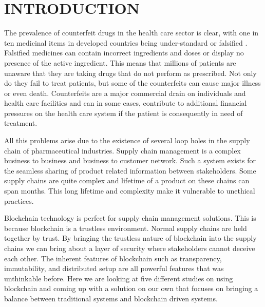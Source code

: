 \documentclass[12pt,a4paper]{report}
\begin{document}
\newpage


\renewcommand{\chaptername}{CHAPTER}
\chapter{INTRODUCTION}
\thispagestyle{fancy}
\pagestyle{fancy}
\renewcommand*{\thepage}{\footnotesize\arabic{page}} %
\onehalfspacing

\setlength{\parindent}{5ex}
\hspace*{1cm}The prevalence of counterfeit drugs in the health care sector is clear, with one in ten medicinal items in developed countries being under-standard or falsified \cite{IEEEexample:article_typical}. Falsified medicines can contain incorrect ingredients and doses or display no presence of the active ingredient. This means that millions of patients are unaware that they are taking drugs that do not perform as prescribed. Not only do they fail to treat patients, but some of the counterfeits can cause major illness or even death. Counterfeits are a major commercial drain on individuals and health care facilities and can in some cases, contribute to additional financial pressures on the health care system if the patient is consequently in need of treatment. 

All this problems arise due to the existence of several loop holes in the supply chain of pharmaceutical industries. Supply chain management is a complex business to business and business to customer network. Such a system exists for the seamless sharing of product related information between stakeholders. Some supply chains are quite complex and lifetime of a product on these chains can span months. This long lifetime and complexity make it vulnerable to unethical practices. 

Blockchain technology \cite{IEEEexample:conf_typical} is perfect for supply chain management solutions. This is because blockchain is a trustless environment. Normal supply chains are held together by trust. By bringing the trustless nature of blockchain into the supply chains we can bring about a layer of security where stakeholders cannot deceive each other. The inherent features of blockchain such as transparency, immutability, and distributed setup are all powerful features that was unthinkable before. Here we are looking at five different studies on using blockchain and coming up with a solution on our own that focuses on bringing a balance between traditional systems and blockchain driven systems. 
\end{document}
